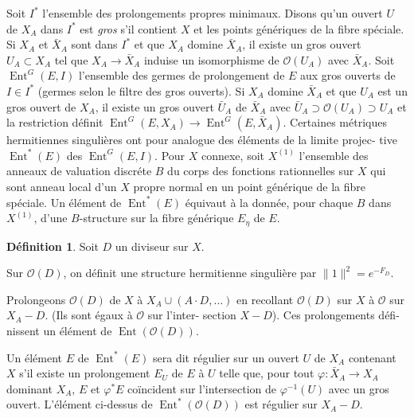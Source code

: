 \documentclass[12pt,a4paper]{article}
\theoremstyle{plain}
\theoremstyle{definition}
\newtheorem{definition}[theorem]{D\'efinition}
\DeclareMathOperator{\Ent}{Ent}
\newcommand{\Oo}{\mathscr{O}}
\begin{document}
Soit $I^*$ l'ensemble des prolongements propres minimaux. Disons qu'un ouvert
$U$ de $X_A$ dans $I^*$ est \emph{gros} s'il contient $X$ et les points g\'en\'eriques de la fibre
sp\'eciale. Si $X_A$ et $\bar{X}_A$ sont dans $I^*$ et que $X_A$ domine $\bar{X}_A$, il existe un
gros ouvert $U_A \subset X_A$ tel que $X_A \to \bar{X}_A$ induise un isomorphisme de $\Oo(U_A)$ avec
$\bar{X}_A$. Soit $\Ent^G(E, I)$ l'ensemble des germes de prolongement de $E$ aux gros ouverts
de $I \in I^*$ (germes selon le filtre des gros ouverts). Si $X_A$ domine $\bar{X}_A$ et que
$U_A$ est un gros ouvert de $X_A$, il existe un gros ouvert $\bar{U}_A$ de $\bar{X}_A$ avec $\bar{U}_A \supset
\Oo(U_A) \supset U_A$ et la restriction d\'efinit $\Ent^G(E, X_A) \to \Ent^G(E, \bar{X}_A)$. Certaines
m\'etriques hermitiennes singuli\`eres ont pour analogue des \'el\'ements de la limite projec-
tive $\Ent^*(E)$ des $\Ent^G(E, I)$. Pour $X$ connexe, soit $X^{(1)}$ l'ensemble des anneaux
de valuation discr\'ete $B$ du corps des fonctions rationnelles sur $X$ qui sont anneau
local d'un $X$ propre normal en un point g\'en\'erique de la fibre sp\'eciale. Un \'el\'ement
de $\Ent^*(E)$ \'equivaut \`a la donn\'ee, pour chaque $B$ dans $X^{(1)}$, d'une $B$-structure
sur la fibre g\'en\'erique $E_\eta$ de $E$.

\begin{definition}
Soit $D$ un diviseur sur $X$.
\end{definition}

\smallskip

\begin{minipage}[t]{0.48\textwidth}
Sur $\Oo(D)$, on d\'efinit une
structure hermitienne
singuli\`ere par $\|1\|^2 = e^{-F_D}$.
\end{minipage}
\hfill
\begin{minipage}[t]{0.48\textwidth}
Prolongeons $\Oo(D)$ de $X$ \`a $X_A \cup (A \cdot D, \ldots)$
en recollant $\Oo(D)$ sur $X$ \`a $\Oo$ sur
$X_A - D$. (Ils sont \'egaux \`a $\Oo$ sur l'inter-
section $X - D$). Ces prolongements d\'efi-
nissent un \'el\'ement de $\Ent(\Oo(D))$.
\end{minipage}

\smallskip

Un \'el\'ement $E$ de $\Ent^*(E)$ sera dit r\'egulier sur un ouvert $U$ de $X_A$ contenant
$X$ s'il existe un prolongement $E_U$ de $E$ \`a $U$ telle que, pour tout $\varphi: \bar{X}_A \to
X_A$ dominant $X_A$, $E$ et $\varphi^*E$ co\"incident sur l'intersection de $\varphi^{-1}(U)$ avec un gros
ouvert. L'\'el\'ement ci-dessus de $\Ent^*(\Oo(D))$ est r\'egulier sur $X_A - D$.
\end{document}
